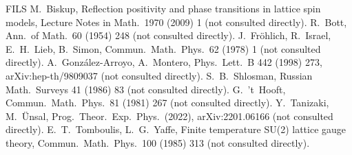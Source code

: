 \documentclass[11pt,a4paper]{article}
\theoremstyle{definition}
\theoremstyle{remark}
\begin{document}
\begin{thebibliography}{FILS}
 M.~Biskup, Reflection positivity and phase transitions in lattice spin models, Lecture Notes in Math.\ 1970 (2009) 1 (not consulted directly).
 R.~Bott, Ann.\ of Math.\ 60 (1954) 248 (not consulted directly).
 J.~Fr\"ohlich, R.~Israel, E.~H.~Lieb, B.~Simon, Commun.\ Math.\ Phys.\ 62 (1978) 1 (not consulted directly).
 A.~Gonz\'alez-Arroyo, A.~Montero, Phys.\ Lett.\ B 442 (1998) 273, arXiv:hep-th/9809037 (not consulted directly).
 S.~B.~Shlosman, Russian Math.\ Surveys 41 (1986) 83 (not consulted directly).
 G.~'t~Hooft, Commun.\ Math.\ Phys.\ 81 (1981) 267 (not consulted directly).
 Y.~Tanizaki, M.~\"Unsal, Prog.\ Theor.\ Exp.\ Phys.\ (2022), arXiv:2201.06166 (not consulted directly).
 E.~T.~Tomboulis, L.~G.~Yaffe, Finite temperature SU(2) lattice gauge theory, Commun.\ Math.\ Phys.\ 100 (1985) 313 (not consulted directly).
\end{thebibliography}
\end{document}
